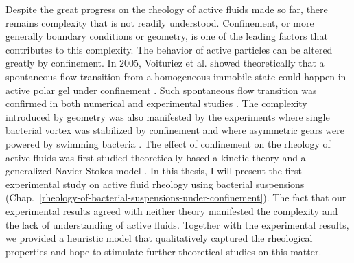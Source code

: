 Despite the great progress on the rheology of active fluids made so far, there remains complexity that is not readily understood. Confinement, or more generally boundary conditions or geometry, is one of the leading factors that contributes to this complexity. The behavior of active particles can be altered greatly by confinement. In 2005, Voituriez et al. showed theoretically that a spontaneous flow transition from a homogeneous immobile state could happen in active polar gel under confinement \cite{Voituriez2005}. Such spontaneous flow transition was confirmed in both numerical and experimental studies \cite{Ravnik2013, Wioland2016, Wu2017}. The complexity introduced by geometry was also manifested by the experiments where single bacterial vortex was stabilized by confinement \cite{Woodhouse2012, Wioland2013, Lushi2014} and where asymmetric gears were powered by swimming bacteria
\cite{Sokolov2010, Hamby2018}. The effect of confinement on the rheology of active fluids was first studied theoretically based a kinetic theory \cite{Alonso-Matilla2016} and a generalized Navier-Stokes model \cite{Somka2017}. In this thesis, I will present the first experimental study on active fluid rheology using bacterial suspensions
(Chap.~\ref{rheology-of-bacterial-suspensions-under-confinement}). The fact that our experimental results agreed with neither theory manifested the complexity and the lack of understanding of active fluids. Together with the experimental results, we provided a heuristic model that qualitatively captured the rheological properties and hope to stimulate further theoretical studies on this matter.




